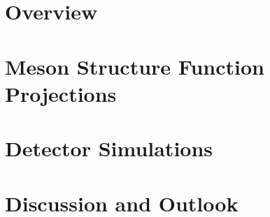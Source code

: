 \label{Chapter-11}

\hypertarget{Section-11.1}{%
\section{Overview}\label{Section-11.1}}

\hypertarget{Section-11.2}{%
\section{Meson Structure Function Projections}\label{Section-11.2}}

\hypertarget{Section-11.3}{%
\section{Detector Simulations}\label{Section-11.3}}

\hypertarget{Section-11.4}{%
\section{Discussion and Outlook}\label{Section-11.4}}


